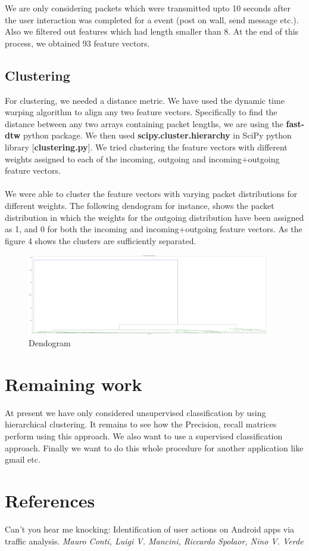 \documentclass[12pt]{article}
\begin{document}
We are only considering packets which were transmitted upto 10 seconds after the user interaction was completed for a event (post on wall, send message etc.). Also we filtered out features which had length smaller than 8. At the end of this process, we obtained 93 feature vectors.

\subsection{Clustering}
For clustering, we needed a distance metric. We have used the dynamic time warping algorithm to align any two feature vectors. Specifically to find the distance between any two arrays containing packet lengths, we are using the \textbf{fast-dtw} python package. We then used \textbf{scipy.cluster.hierarchy} in SciPy python library [\textbf{clustering.py}]. We tried clustering the feature vectors with different weights assigned to each of the incoming, outgoing and incoming+outgoing feature vectors.\\\\
We were able to cluster the feature vectors with varying packet distributions for different weights. The following dendogram for instance, shows the packet distribution in which the weights for the outgoing distribution have been assigned as 1, and 0 for both the incoming and incoming+outgoing feature vectors. As the figure 4 shows the clusters are sufficiently separated.

    \begin{figure}[h]
    \begin{center}
       \includegraphics[width=400px]{dendogram_outweight_1.png}
    \end{center}
       \caption{Dendogram }
    \label{fig:long}
    \label{fig:onecol}
    \end{figure}
    
\section{Remaining work}
At present we have only considered unsupervised classification by using hierarchical clustering. It remains to see how the Precision, recall matrices perform using this approach. We also want to use a supervised classification approach. Finally we want to do this whole procedure for another application like gmail etc.

\section{References}
Can't you hear me knocking: Identification of user actions on Android apps via traffic analysis. \textit{Mauro Conti, Luigi V. Mancini, Riccardo Spolaor, Nino V. Verde}
\end{document}
